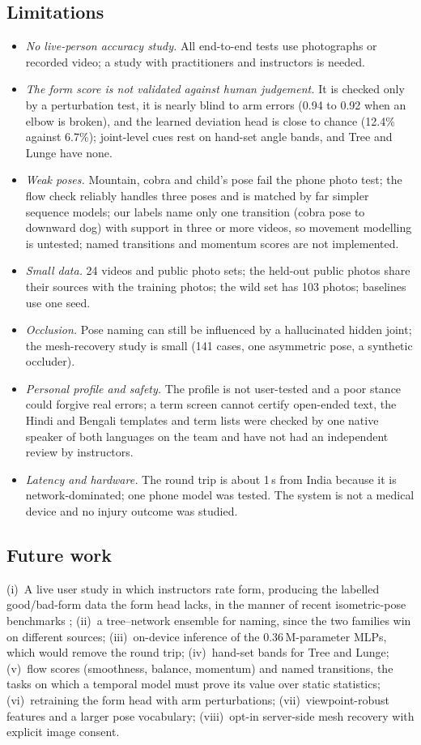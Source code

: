 \subsection{Limitations}
\begin{itemize}
\item \emph{No live-person accuracy study.} All end-to-end tests use photographs or recorded video; a study with practitioners and instructors is needed.
\item \emph{The form score is not validated against human judgement.} It is checked only by a perturbation test, it is nearly blind to arm errors (0.94 to 0.92 when an elbow is broken), and the learned deviation head is close to chance (12.4\% against 6.7\%); joint-level cues rest on hand-set angle bands, and Tree and Lunge have none.
\item \emph{Weak poses.} Mountain, cobra and child's pose fail the phone photo test; the flow check reliably handles three poses and is matched by far simpler sequence models; our labels name only one transition (cobra pose to downward dog) with support in three or more videos, so movement modelling is untested; named transitions and momentum scores are not implemented.
\item \emph{Small data.} 24 videos and public photo sets; the held-out public photos share their sources with the training photos; the wild set has 103 photos; baselines use one seed.
\item \emph{Occlusion.} Pose naming can still be influenced by a hallucinated hidden joint; the mesh-recovery study is small (141 cases, one asymmetric pose, a synthetic occluder).
\item \emph{Personal profile and safety.} The profile is not user-tested and a poor stance could forgive real errors; a term screen cannot certify open-ended text, the Hindi and Bengali templates and term lists were checked by one native speaker of both languages on the team and have not had an independent review by instructors.
\item \emph{Latency and hardware.} The round trip is about 1\,s from India because it is network-dominated; one phone model was tested. The system is not a medical device and no injury outcome was studied.
\end{itemize}

\subsection{Future work}
(i)~A live user study in which instructors rate form, producing the labelled good/bad-form data the form head lacks, in the manner of recent isometric-pose benchmarks \cite{jaiswal2025isometric}; (ii)~a tree--network ensemble for naming, since the two families win on different sources; (iii)~on-device inference of the 0.36\,M-parameter MLPs, which would remove the round trip; (iv)~hand-set bands for Tree and Lunge; (v)~flow scores (smoothness, balance, momentum) and named transitions, the tasks on which a temporal model must prove its value over static statistics; (vi)~retraining the form head with arm perturbations; (vii)~viewpoint-robust features and a larger pose vocabulary; (viii)~opt-in server-side mesh recovery with explicit image consent.

